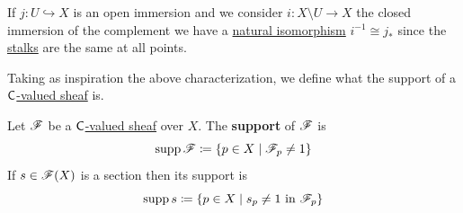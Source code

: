 \documentclass[../../main]{subfiles}
\begin{document}
\begin{remark}
  If \(j\colon U \hookrightarrow X\) is an open immersion and we consider \(i\colon X \setminus U \to X\) the closed immersion of the complement we have a \hyperref[def:natural-transformation]{natural isomorphism} \(i^{-1} \cong j_{\ast}\) since the \hyperref[def:stalk]{stalks} are the same at all points.
\end{remark}





Taking as inspiration the above characterization, we define what the support of a \hyperref[def:sheaf]{\(\mathsf{C}\)-valued sheaf} is.
\begin{definition}\label{def:support-sheaf}
  Let \(\mathscr{F}\) be a \hyperref[def:sheaf]{\(\mathsf{C}\)-valued sheaf} over \(X\).
  The \textbf{support} of \(\mathscr{F}\) is
  \begin{equation*}
    \operatorname{supp} \mathscr{F} \coloneq \{ p \in X \mid \mathscr{F}_{p} \neq 1 \}
  \end{equation*}
  If \(s \in \mathscr{F}(X)\) is a section then its support is
  \begin{equation*}
    \operatorname{supp} s \coloneq \{ p \in X \mid s_{p} \neq 1 \text{ in } \mathscr{F}_{p} \}
  \end{equation*}
\end{definition}
\end{document}
